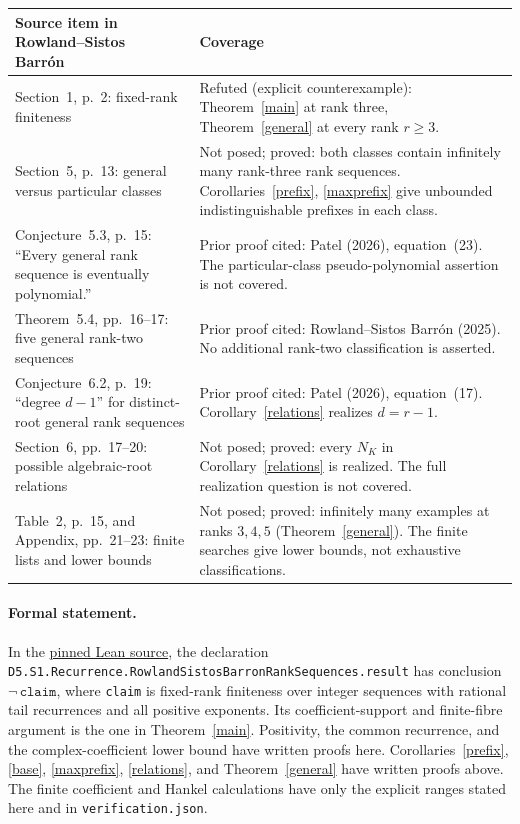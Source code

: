 \documentclass[11pt]{article}
\begin{document}
\begin{center}
\small
\begin{tabular}{@{}p{.43\linewidth}p{.50\linewidth}@{}}
\toprule
Source item in Rowland--Sistos Barr\'on~\cite{RSB} & Coverage\\
\midrule
Section~1, p.~2: fixed-rank finiteness &
Refuted (explicit counterexample): Theorem~\ref{main} at rank three,
Theorem~\ref{general} at every rank $r\geq3$.\\[3pt]
Section~5, p.~13: general versus particular classes &
Not posed; proved: both classes contain infinitely many rank-three
rank sequences. Corollaries~\ref{prefix}, \ref{maxprefix} give unbounded
indistinguishable prefixes in each class.\\[3pt]
Conjecture~5.3, p.~15: ``Every general rank sequence is eventually
polynomial.'' &
Prior proof cited: Patel (2026), equation~(23).
The particular-class pseudo-polynomial assertion is not covered.\\[3pt]
Theorem~5.4, pp.~16--17: five general rank-two sequences &
Prior proof cited: Rowland--Sistos Barr\'on (2025).
No additional rank-two classification is asserted.\\[3pt]
Conjecture~6.2, p.~19: ``degree $d-1$'' for distinct-root general rank
sequences &
Prior proof cited: Patel (2026), equation~(17).
Corollary~\ref{relations} realizes $d=r-1$.\\[3pt]
Section~6, pp.~17--20: possible algebraic-root relations &
Not posed; proved: every $N_K$ in Corollary~\ref{relations} is realized.
The full realization question is not covered.\\[3pt]
Table~2, p.~15, and Appendix, pp.~21--23: finite lists and lower bounds &
Not posed; proved: infinitely many examples at ranks $3,4,5$
(Theorem~\ref{general}). The finite searches give lower bounds,
not exhaustive classifications.\\
\bottomrule
\end{tabular}
\end{center}

\paragraph{Formal statement.}
\begin{sloppypar}
In the \href{https://github.com/the-omega-institute/trureturing/blob/b0f7c01b01511ea00428c1b6edad5dd2b372eaf8/D5/S1/Recurrence/RowlandSistosBarronRankSequences.lean}{pinned Lean source}, the declaration
\nolinkurl{D5.S1.Recurrence.RowlandSistosBarronRankSequences.result}
has conclusion $\neg\,\texttt{claim}$, where \texttt{claim} is fixed-rank
finiteness over integer sequences with rational tail recurrences and all
positive exponents. Its coefficient-support and finite-fibre argument is
the one in Theorem~\ref{main}. Positivity, the common recurrence,
and the complex-coefficient lower bound have written proofs here.
Corollaries~\ref{prefix}, \ref{base},
\ref{maxprefix}, \ref{relations}, and Theorem~\ref{general} have written
proofs above. The finite coefficient and Hankel calculations have only
the explicit ranges stated here and in \texttt{verification.json}.
\end{sloppypar}
\end{document}
